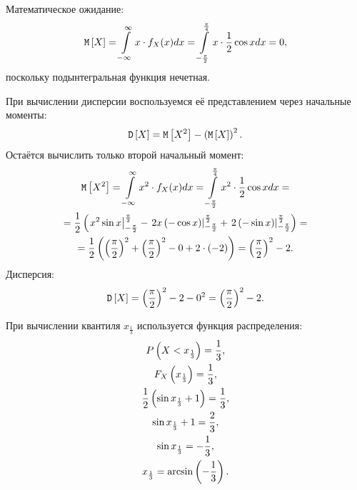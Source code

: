 Математическое ожидание:
\begin{equation}
    \mathtt{M} \left [ X \right ]
    = \int \limits_{-\infty}^{\infty} x \cdot f_X(x) dx
    = \int \limits_{-\frac{\pi}{2}}^{\frac{\pi}{4}} x \cdot \frac{1}{2} \cos x dx
    = 0,
\end{equation}
поскольку подынтегральная функция нечетная.

При вычислении дисперсии воспользуемся её представлением через начальные моменты:
\begin{equation}
    \mathtt{D} \left [ X \right ] = \mathtt{M} \left [ X^2 \right ] - \left ( \mathtt{M} \left [ X \right ] \right )^2 .
\end{equation}
Остаётся вычислить только второй начальный момент:
\begin{multline}
    \mathtt{M} \left [ X^2 \right ]
    = \int \limits_{-\infty}^{\infty} x^2 \cdot f_X(x) dx
    = \int \limits_{-\frac{\pi}{2}}^{\frac{\pi}{4}} x^2 \cdot \frac{1}{2} \cos x dx = \\
    = \frac{1}{2} \left (
    \left . x^2 \sin x \right |_{-\frac{\pi}{2}}^{\frac{\pi}{2}}
    - \left . 2 x \left ( - \cos x \right )\right |_{-\frac{\pi}{2}}^{\frac{\pi}{2}}
    + \left . 2 \left ( - \sin x \right )\right |_{-\frac{\pi}{2}}^{\frac{\pi}{2}}
    \right )
    = \\
    = \frac{1}{2} \left (
    \left ( \frac{\pi}{2} \right )^2 +  \left ( \frac{\pi}{2} \right )^2
    - 0
    + 2 \cdot ( - 2 )
    \right )
    = \left ( \frac{\pi}{2} \right )^2 - 2.
\end{multline}
Дисперсия:
\begin{equation}
    \mathtt{D} \left [ X \right ]
    = \left ( \frac{\pi}{2} \right )^2 - 2 - 0^2
    = \left ( \frac{\pi}{2} \right )^2 - 2.
\end{equation}

При вычислении квантиля $x_{\frac{1}{3}}$ используется функция распределения:
\begin{gather}
    P \left ( X < x_{\frac{1}{3}} \right ) = \frac{1}{3} , \\
    F_X \left ( x_{\frac{1}{3}} \right ) = \frac{1}{3} , \\
    \frac{1}{2} \left ( \sin x_{\frac{1}{3}} + 1 \right ) = \frac{1}{3} , \\
    \sin x_{\frac{1}{3}} + 1 = \frac{2}{3} , \\
    \sin x_{\frac{1}{3}} = - \frac{1}{3} , \\
    x_{\frac{1}{3}} = \arcsin \left (- \frac{1}{3} \right ) .
\end{gather}

